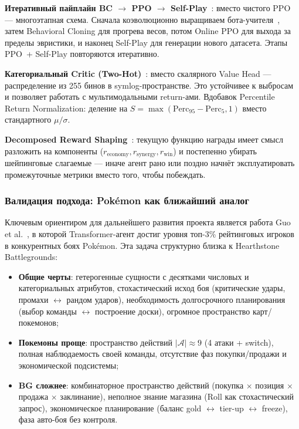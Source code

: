 \documentclass[a4paper,12pt]{extarticle}
\begin{document}
\textbf{Итеративный пайплайн BC $\to$ PPO $\to$ Self-Play}~\cite{pokemon}: вместо чистого PPO --- многоэтапная схема. Сначала коэволюционно выращиваем бота-учителя~\cite{coevolution}, затем Behavioral Cloning для прогрева весов, потом Online PPO для выхода за пределы эвристики, и наконец Self-Play для генерации нового датасета. Этапы PPO~+ Self-Play повторяются итеративно.

\textbf{Категориальный Critic (Two-Hot)}~\cite{dreamerv3}: вместо скалярного Value Head --- распределение из 255 бинов в symlog-пространстве. Это устойчивее к выбросам и позволяет работать с мультимодальными return-ами. Вдобавок Percentile Return Normalization: деление на $S = \max(\text{Perc}_{95} - \text{Perc}_{5}, 1)$ вместо стандартного $\mu/\sigma$.

\textbf{Decomposed Reward Shaping}~\cite{pokemon}: текущую функцию награды имеет смысл разложить на компоненты ($r_{\text{economy}}, r_{\text{synergy}}, r_{\text{win}}$) и постепенно убирать шейпинговые слагаемые --- иначе агент рано или поздно начнёт эксплуатировать промежуточные метрики вместо того, чтобы побеждать.

\subsubsection{Валидация подхода: Pok\'{e}mon как ближайший аналог}

Ключевым ориентиром для дальнейшего развития проекта является работа Guo et al.~\cite{pokemon}, в которой Transformer-агент достиг уровня топ-3\% рейтинговых игроков в конкурентных боях Pok\'{e}mon. Эта задача структурно близка к Hearthstone Battlegrounds:

\begin{itemize}[noitemsep]
  \item \textbf{Общие черты}: гетерогенные сущности с десятками числовых и категориальных атрибутов, стохастический исход боя (критические удары, промахи $\leftrightarrow$ рандом ударов), необходимость долгосрочного планирования (выбор команды $\leftrightarrow$ построение доски), огромное пространство карт/покемонов;
  \item \textbf{Покемоны проще}: пространство действий $|\mathcal{A}| \approx 9$ (4 атаки + switch), полная наблюдаемость своей команды, отсутствие фаз покупки/продажи и экономической подсистемы;
  \item \textbf{BG сложнее}: комбинаторное пространство действий (покупка $\times$ позиция $\times$ продажа $\times$ заклинание), неполное знание магазина (Roll как стохастический запрос), экономическое планирование (баланс gold $\leftrightarrow$ tier-up $\leftrightarrow$ freeze), фаза авто-боя без контроля.
\end{itemize}
\end{document}
